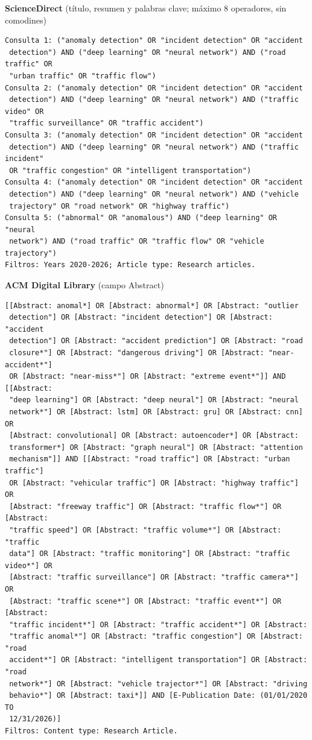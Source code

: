 \documentclass[12pt, a4paper]{article}
\begin{document}
{\noindent\textbf{ScienceDirect} (t\'{i}tulo, resumen y palabras clave; m\'{a}ximo 8 operadores, sin comodines)
\begin{verbatim}
Consulta 1: ("anomaly detection" OR "incident detection" OR "accident
 detection") AND ("deep learning" OR "neural network") AND ("road traffic" OR
 "urban traffic" OR "traffic flow")
Consulta 2: ("anomaly detection" OR "incident detection" OR "accident
 detection") AND ("deep learning" OR "neural network") AND ("traffic video" OR
 "traffic surveillance" OR "traffic accident")
Consulta 3: ("anomaly detection" OR "incident detection" OR "accident
 detection") AND ("deep learning" OR "neural network") AND ("traffic incident"
 OR "traffic congestion" OR "intelligent transportation")
Consulta 4: ("anomaly detection" OR "incident detection" OR "accident
 detection") AND ("deep learning" OR "neural network") AND ("vehicle
 trajectory" OR "road network" OR "highway traffic")
Consulta 5: ("abnormal" OR "anomalous") AND ("deep learning" OR "neural
 network") AND ("road traffic" OR "traffic flow" OR "vehicle trajectory")
Filtros: Years 2020-2026; Article type: Research articles.
\end{verbatim}

\noindent\textbf{ACM Digital Library} (campo Abstract)
\begin{verbatim}
[[Abstract: anomal*] OR [Abstract: abnormal*] OR [Abstract: "outlier
 detection"] OR [Abstract: "incident detection"] OR [Abstract: "accident
 detection"] OR [Abstract: "accident prediction"] OR [Abstract: "road
 closure*"] OR [Abstract: "dangerous driving"] OR [Abstract: "near-accident*"]
 OR [Abstract: "near-miss*"] OR [Abstract: "extreme event*"]] AND [[Abstract:
 "deep learning"] OR [Abstract: "deep neural"] OR [Abstract: "neural
 network*"] OR [Abstract: lstm] OR [Abstract: gru] OR [Abstract: cnn] OR
 [Abstract: convolutional] OR [Abstract: autoencoder*] OR [Abstract:
 transformer*] OR [Abstract: "graph neural"] OR [Abstract: "attention
 mechanism"]] AND [[Abstract: "road traffic"] OR [Abstract: "urban traffic"]
 OR [Abstract: "vehicular traffic"] OR [Abstract: "highway traffic"] OR
 [Abstract: "freeway traffic"] OR [Abstract: "traffic flow*"] OR [Abstract:
 "traffic speed"] OR [Abstract: "traffic volume*"] OR [Abstract: "traffic
 data"] OR [Abstract: "traffic monitoring"] OR [Abstract: "traffic video*"] OR
 [Abstract: "traffic surveillance"] OR [Abstract: "traffic camera*"] OR
 [Abstract: "traffic scene*"] OR [Abstract: "traffic event*"] OR [Abstract:
 "traffic incident*"] OR [Abstract: "traffic accident*"] OR [Abstract:
 "traffic anomal*"] OR [Abstract: "traffic congestion"] OR [Abstract: "road
 accident*"] OR [Abstract: "intelligent transportation"] OR [Abstract: "road
 network*"] OR [Abstract: "vehicle trajector*"] OR [Abstract: "driving
 behavio*"] OR [Abstract: taxi*]] AND [E-Publication Date: (01/01/2020 TO
 12/31/2026)]
Filtros: Content type: Research Article.
\end{verbatim}
}
\end{document}
